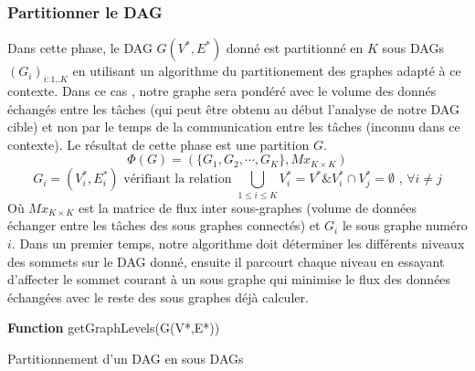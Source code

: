 \subsubsection{Partitionner le DAG}
%
Dans cette phase, le DAG $G(V^*,E^*)$ donné est partitionné en $K$ sous DAGs  $(G_i)_{i:1..K}$ en utilisant un algorithme du partitionement des graphes adapté à ce contexte. Dans ce cas , notre graphe sera pondéré avec le volume des donnés échangés entre les tâches (qui peut être obtenu au début l'analyse de notre DAG cible) et non par le temps de la communication entre les tâches (inconnu dans ce contexte). 
Le résultat de cette phase est une partition $G$.   %
%
$$
\Phi(G) = (\{ G_1, G_2, \cdots , G_K\}, Mx_{K \times K}) 
$$
$$
G_i = (V^*_i, E^*_i) \text{ vérifiant la relation } \bigcup_{1 \le i \le K} V^*_i = V^* \&  V^*_i \cap V^*_j = \emptyset \text{ , } \forall i \neq j
$$
%
Où $Mx_{K \times K}$ est la matrice de flux inter sous-graphes (volume de données échanger entre les tâches des sous graphes connectés) et $G_i$ le sous graphe numéro $i$. 
Dans un premier temps, notre algorithme doit déterminer les différents niveaux des sommets sur le DAG donné, ensuite il parcourt chaque niveau en essayant d'affecter le sommet courant à un sous graphe qui minimise le flux des données échangées avec le reste des sous graphes déjà calculer.
\begin{algorithm}
\DontPrintSemicolon
\SetNoFillComment %

%

\BlankLine 

\textbf{Function } getGraphLevels(G(V*,E*))\\ 
\caption{Partitionnement d'un DAG en sous DAGs}
\end{algorithm}              %
